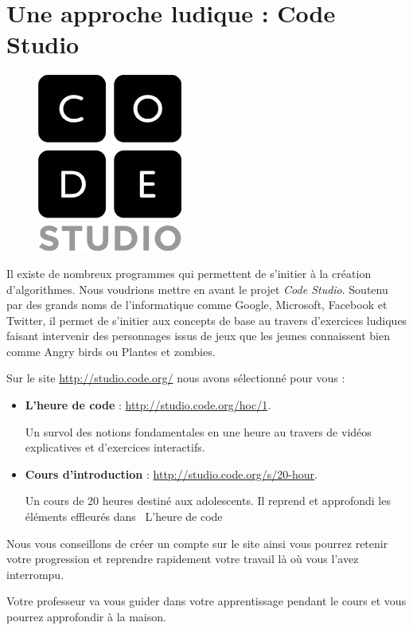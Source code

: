 \chapter{Une approche ludique : Code Studio}

	\begin{figure}
	\vskip-4mm
	\includegraphics[scale=0.2]{image/codeorg-studio-logo.png}
	\vskip-2mm
	\end{figure}
	
	Il existe de nombreux programmes 
	qui permettent de s'initier à la création d'algorithmes.
	Nous voudrions mettre en avant le projet \emph{Code Studio}.
	Soutenu par des grands noms de l'informatique 
	comme \textsf{Google}, \textsf{Microsoft}, 
	\textsf{Facebook} et \textsf{Twitter},
	il permet de s'initier aux concepts de base
	au travers d'exercices ludiques faisant intervenir 
	des personnages issus de jeux que les jeunes connaissent bien 
	comme \textsf{Angry birds} ou \textsf{Plantes et zombies}.
	
	Sur le site \url{http://studio.code.org/} 
	nous avons sélectionné pour vous :

	\begin{itemize}
	\item
		\textbf{L'heure de code} : 
		\url{http://studio.code.org/hoc/1}.
		
		Un survol des notions fondamentales en une heure
		au travers de vidéos explicatives et d'exercices interactifs.
	\item
		\textbf{Cours d'introduction} : 
		\url{http://studio.code.org/s/20-hour}.
		
		Un cours de 20 heures destiné aux adolescents.
		Il reprend et approfondi les éléments effleurés dans
		\og\ L'heure de code\fg	
	\end{itemize}
	
	Nous vous conseillons de créer un compte sur le site
	ainsi vous pourrez retenir votre progression
	et reprendre rapidement votre travail là où vous l'avez
	interrompu.
	
	Votre professeur va vous guider dans votre apprentissage
	pendant le cours et vous pourrez approfondir à la maison.
	
